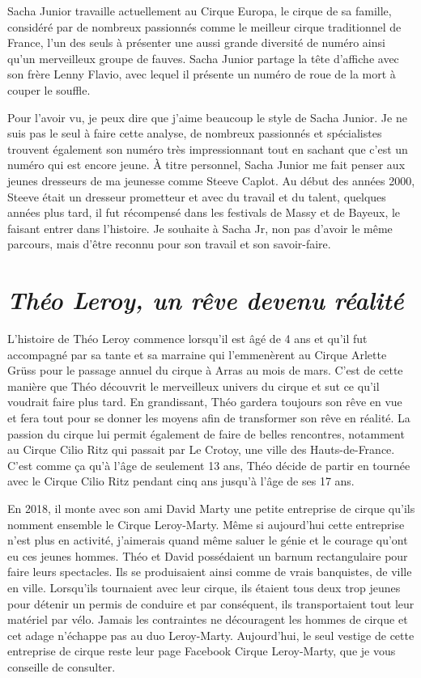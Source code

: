 Sacha Junior travaille actuellement au Cirque Europa, le cirque de sa famille, considéré par de nombreux passionnés comme le meilleur cirque traditionnel de France, l'un des seuls à présenter une aussi grande diversité de numéro ainsi qu'un merveilleux groupe de fauves. Sacha Junior partage la tête d'affiche avec son frère Lenny Flavio, avec lequel il présente un numéro de roue de la mort à couper le souffle.

Pour l'avoir vu, je peux dire que j'aime beaucoup le style de Sacha Junior. Je ne suis pas le seul à faire cette analyse, de nombreux passionnés et spécialistes trouvent également son numéro très impressionnant tout en sachant que c'est un numéro qui est encore jeune. À titre personnel, Sacha Junior me fait penser aux jeunes dresseurs de ma jeunesse comme Steeve Caplot. Au début des années 2000, Steeve était un dresseur prometteur et avec du travail et du talent, quelques années plus tard, il fut récompensé dans les festivals de Massy et de Bayeux, le faisant entrer dans l'histoire. Je souhaite à Sacha Jr, non pas d'avoir le même parcours, mais d'être reconnu pour son travail et son savoir-faire. 

\section*{\textit{Théo Leroy, un rêve devenu réalité }}

L'histoire de Théo Leroy commence lorsqu’il est âgé de 4 ans et qu'il fut accompagné par sa tante et sa marraine qui l'emmenèrent au Cirque Arlette Grüss pour le passage annuel du cirque à Arras au mois de mars. C'est de cette manière que Théo découvrit le merveilleux univers du cirque et sut ce qu'il voudrait faire plus tard. En grandissant, Théo gardera toujours son rêve en vue et fera tout pour se donner les moyens afin de transformer son rêve en réalité. La passion du cirque lui permit également de faire de belles rencontres, notamment au Cirque Cilio Ritz qui passait par Le Crotoy, une ville des Hauts-de-France. C'est comme ça qu'à l'âge de seulement 13 ans, Théo décide de partir en tournée avec le Cirque Cilio Ritz pendant cinq ans jusqu'à l'âge de ses 17 ans.

En 2018, il monte avec son ami David Marty une petite entreprise de cirque qu'ils nomment ensemble le Cirque Leroy-Marty. Même si aujourd'hui cette entreprise n'est plus en activité, j'aimerais quand même saluer le génie et le courage qu'ont eu ces jeunes hommes. Théo et David possédaient un barnum rectangulaire pour faire leurs spectacles. Ils se produisaient ainsi comme de vrais banquistes, de ville en ville. Lorsqu'ils tournaient avec leur cirque, ils étaient tous deux trop jeunes pour détenir un permis de conduire et par conséquent, ils transportaient tout leur matériel par vélo. Jamais les contraintes ne découragent les hommes de cirque et cet adage n'échappe pas au duo Leroy-Marty. Aujourd'hui, le seul vestige de cette entreprise de cirque reste leur page Facebook Cirque Leroy-Marty, que je vous conseille de consulter.

